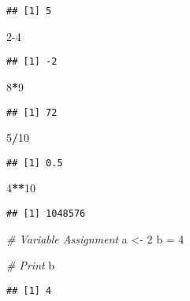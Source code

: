 \documentclass[
]{article}
\newenvironment{Shaded}{\begin{snugshade}}{\end{snugshade}}
\newcommand{\CommentTok}[1]{\textcolor[rgb]{0.56,0.35,0.01}{\textit{#1}}}
\newcommand{\DecValTok}[1]{\textcolor[rgb]{0.00,0.00,0.81}{#1}}
\newcommand{\NormalTok}[1]{#1}
\newcommand{\OtherTok}[1]{\textcolor[rgb]{0.56,0.35,0.01}{#1}}
\newcommand{\SpecialCharTok}[1]{\textcolor[rgb]{0.81,0.36,0.00}{\textbf{#1}}}
\begin{document}
\begin{verbatim}
## [1] 5
\end{verbatim}

\begin{Shaded}
\begin{Highlighting}[]
\DecValTok{2{-}4}
\end{Highlighting}
\end{Shaded}

\begin{verbatim}
## [1] -2
\end{verbatim}

\begin{Shaded}
\begin{Highlighting}[]
\DecValTok{8}\SpecialCharTok{*}\DecValTok{9}
\end{Highlighting}
\end{Shaded}

\begin{verbatim}
## [1] 72
\end{verbatim}

\begin{Shaded}
\begin{Highlighting}[]
\DecValTok{5}\SpecialCharTok{/}\DecValTok{10}
\end{Highlighting}
\end{Shaded}

\begin{verbatim}
## [1] 0.5
\end{verbatim}

\begin{Shaded}
\begin{Highlighting}[]
\DecValTok{4}\SpecialCharTok{**}\DecValTok{10}
\end{Highlighting}
\end{Shaded}

\begin{verbatim}
## [1] 1048576
\end{verbatim}

\begin{Shaded}
\begin{Highlighting}[]
\CommentTok{\# Variable Assignment}
\NormalTok{a }\OtherTok{\textless{}{-}} \DecValTok{2}
\NormalTok{b }\OtherTok{=} \DecValTok{4}

\CommentTok{\# Print}
\NormalTok{b}
\end{Highlighting}
\end{Shaded}

\begin{verbatim}
## [1] 4
\end{verbatim}
\end{document}
